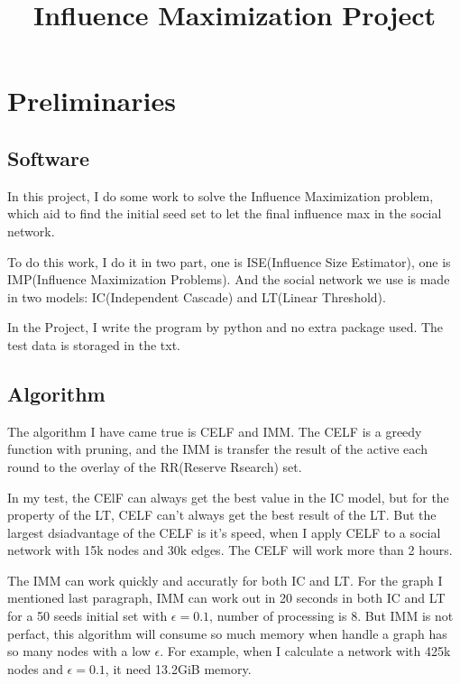 \documentclass[conference,compsoc]{IEEEtran}
\begin{document}
\title{Influence Maximization Project}
\author{
}
\maketitle
\IEEEpeerreviewmaketitle 



\section{Preliminaries}
  \subsection{Software}
    In this project, I do some work to solve the Influence Maximization problem, which aid to find the initial seed set to let the final influence max in the social network.

    To do this work, I do it in two part, one is ISE(Influence Size Estimator), one is IMP(Influence Maximization Problems). And the social network we use is made in two models: IC(Independent Cascade) and LT(Linear Threshold).

    In the Project, I write the program by python and no extra package used. The test data is storaged in the txt. 

  \subsection{Algorithm}
    The algorithm I have came true is CELF and IMM. 
    The CELF is a greedy function with pruning, and the IMM is transfer the result of the active each round to the overlay of the RR(Reserve Rsearch) set.
    
    In my test, the CElF can always get the best value in the IC model, but for the property of the LT, CELF can't always get the best result of the LT. But the largest dsiadvantage of the CELF is it's speed, when I apply CELF to a social network with 15k nodes and 30k edges. The CELF will work more than 2 hours.

    The IMM can work quickly and accuratly for both IC and LT. For the graph I mentioned last paragraph, IMM can work out in 20 seconds in both IC and LT for a 50 seeds initial set with $\epsilon = 0.1$, number of processing is 8.
    But IMM is not perfact, this algorithm will consume so much memory when handle a graph has so many nodes with a low $\epsilon$. For example, when I calculate a network with 425k nodes and $\epsilon = 0.1$, it need 13.2GiB memory.
    
\end{document}
